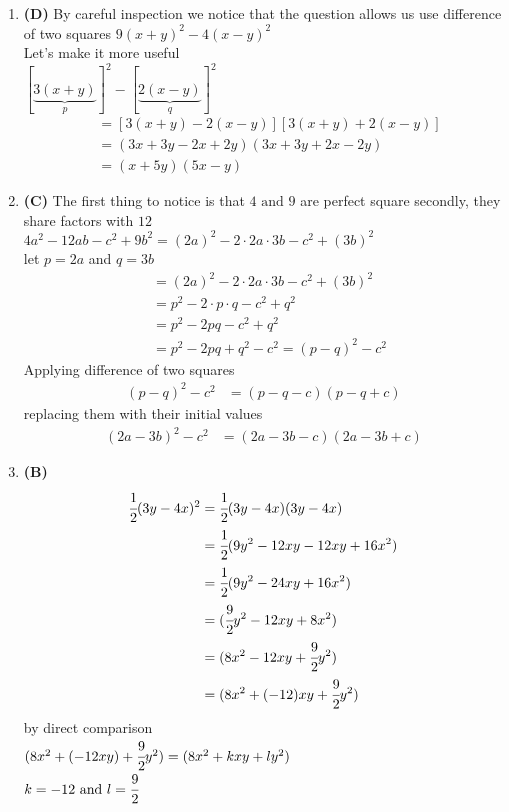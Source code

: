 \begin{multicols}{2}
\begin{enumerate}[label={\textbf{\arabic*.}}]
    \item \textbf{(D)} By careful inspection we notice that the question allows us use difference of two squares $9(x+y)^2 - 4(x-y)^2 $ \\
    Let's make it more useful \\
    $[\underbrace{3(x + y)}_{p}]^2 - [\underbrace{2(x - y)}_{q}]^2$
    \begin{align*} 
        & = \left[3(x+y) - 2(x -y)\right]\left[3(x+y) + 2(x - y)\right] \\
        & = \left(3x+3y - 2x +2y\right)\left(3x+3y + 2x - 2y\right) \\
        & = (x + 5y)(5x  - y)
    \end{align*}
    \item \textbf{(C)} The first thing to notice is that $4 \text{ and } 9$ are perfect square
    secondly, they share factors with $12$ \\
    $ 4a^2-12ab-c^2+9b^2 = (2a)^2 - 2\cdot 2a \cdot 3b - c^2 + (3b)^2$ \\
    let $p = 2a$ and $q = 3b$ 
    \begin{align*}
       & = (2a)^2 - 2\cdot 2a \cdot 3b - c^2 + (3b)^2 \\
       & = p^2 - 2\cdot p \cdot q - c^2 + q^2 \\
       & = p^2 - 2pq - c^2 + q^2 \\
       & = p^2 - 2pq + q^2 - c^2 = (p - q)^2 - c^2  
    \end{align*}
    Applying difference of two squares 
    \begin{align*}
        (p - q)^2 - c^2  & = (p - q - c)(p - q + c) 
    \end{align*}
    replacing them with their initial values 
    \begin{align*}
        (2a - 3b)^2 - c^2  & = (2a - 3b - c)(2a - 3b + c) 
    \end{align*}

    \item \textbf{(B)} \begin{align*} 
        \cfrac{1}{2}(3y - 4x)^2 &= \cfrac{1}{2}(3y - 4x)(3y - 4x) \\
         & = \cfrac{1}{2}(9y^2 - 12xy -12xy + 16x^2) \\
         & = \cfrac{1}{2}(9y^2 - 24xy + 16x^2) \\
         & = (\cfrac{9}{2}y^2 - 12xy + 8x^2) \\ 
         &= (8x^2 - 12xy + \cfrac{9}{2}y^2 )  \\ 
         &= (8x^2 + (-12)xy + \cfrac{9}{2}y^2 )         
    \end{align*} 
    by direct comparison \\
    $(8x^2 + (-12xy) + \cfrac{9}{2}y^2) = (8x^2 + kxy + ly^2 ) $ \\
    $k = -12 \text { and } l = \cfrac{9}{2}$


\end{enumerate}
\end{multicols}
